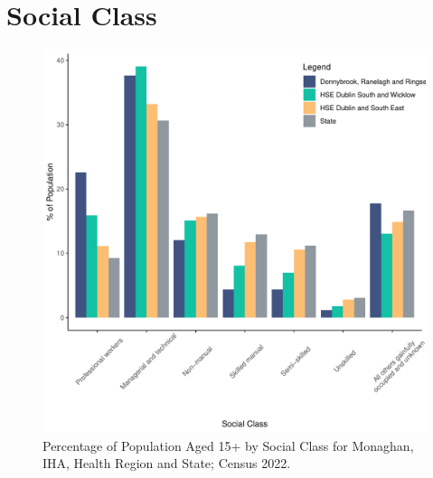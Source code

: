 \documentclass{article}
\begin{document}
\section{Social Class}\label{sect:SC}
\begin{figure}[H]
	\centering
	\includegraphics[width = 140mm]{../figures/SocialClassED.pdf}
	\caption{Percentage of Population Aged 15+ by Social Class for Monaghan, IHA, Health Region and State; Census 2022.}
	\label{fig:vbnv}
	\end{figure}
\end{document}
